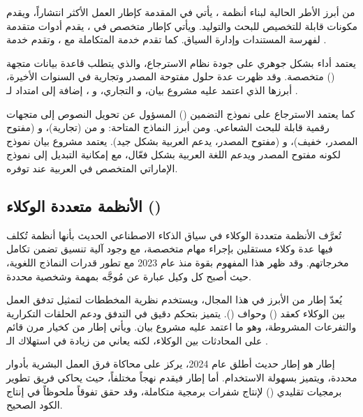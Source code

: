 من أبرز الأطر الحالية لبناء أنظمة ، يأتي 
\cite{langchain2023} في المقدمة كإطار العمل الأكثر انتشاراً، ويقدم مكونات
قابلة للتخصيص للبحث والتوليد. ويأتي  \cite{llamaindex2023}
كإطار متخصص في ، يقدم أدوات متقدمة لفهرسة المستندات وإدارة السياق.
كما تقدم  خدمة  المتكاملة مع ،
وتقدم  خدمة .

يعتمد أداء  بشكل جوهري على جودة نظام الاسترجاع، والذي يتطلب قاعدة
بيانات متجهة () متخصصة. وقد ظهرت عدة حلول مفتوحة المصدر
وتجارية في السنوات الأخيرة، أبرزها  \cite{qdrant2024} الذي اعتمد
عليه مشروع بيان، و  التجاري، و ، إضافة إلى امتداد
 لـ .

كما يعتمد الاسترجاع على نموذج التضمين () المسؤول عن تحويل
النصوص إلى متجهات رقمية قابلة للبحث الشعاعي. ومن أبرز النماذج المتاحة:
 و  من 
(تجارية)، و  (مفتوح المصدر، خفيف)، و
 (مفتوح المصدر، يدعم العربية بشكل جيد). يعتمد مشروع
بيان نموذج  لكونه مفتوح المصدر ويدعم اللغة العربية
بشكل فعّال، مع إمكانية التبديل إلى نموذج  الإماراتي
المتخصص في العربية عند توفره.

\subsection{الأنظمة متعددة الوكلاء ()}
\label{subsec:multi-agent}

تُعرَّف الأنظمة متعددة الوكلاء في سياق الذكاء الاصطناعي الحديث بأنها أنظمة
تُكلف فيها عدة وكلاء مستقلين بإجراء مهام متخصصة، مع وجود آلية تنسيق تضمن
تكامل مخرجاتهم. وقد ظهر هذا المفهوم بقوة منذ عام 2023 مع تطور قدرات النماذج
اللغوية، حيث أصبح كل وكيل عبارة عن  مُوجَّه بمهمة وشخصية محددة.

يُعدّ إطار  \cite{langgraph2024} من  الأبرز في
هذا المجال، ويستخدم نظرية المخططات لتمثيل تدفق العمل بين الوكلاء كعقد
() وحواف (). يتميز بتحكم دقيق في التدفق ودعم الحلقات
التكرارية والتفرعات المشروطة، وهو ما اعتمد عليه مشروع بيان. ويأتي إطار
 \cite{wu2023autogen} من  كخيار مرن قائم
على المحادثات بين الوكلاء، لكنه يعاني من زيادة في استهلاك الـ .

إطار  \cite{crewai2024} هو إطار حديث أطلق عام 2024، يركز على
محاكاة فرق العمل البشرية بأدوار محددة، ويتميز بسهولة الاستخدام. أما إطار
 \cite{hong2024metagpt} فيقدم نهجاً مختلفاً، حيث يحاكي فريق تطوير
برمجيات تقليدي () لإنتاج شفرات
برمجية متكاملة، وقد حقق تفوقاً ملحوظاً في إنتاج الكود الصحيح.

